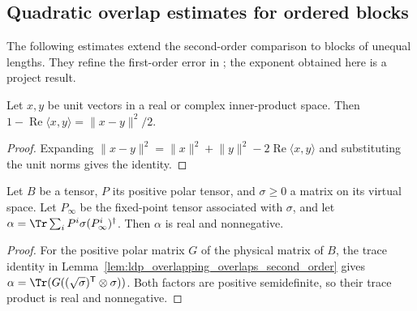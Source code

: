 \subsection{Quadratic overlap estimates for ordered blocks}

The following estimates extend the second-order comparison to blocks of
unequal lengths. They refine the first-order error in
\cite[Lemma~1$'$(i), eq.~(S11)]{Malz2024Preparation}; the exponent obtained
here is a project result.

\begin{lemma}
    \label{thm:ldp_unit_vector_deficit}
    \leanok
    Let $x,y$ be unit vectors in a real or complex inner-product space. Then
    $1-\operatorname{Re}\langle x,y\rangle=\lVert x-y\rVert^2/2$.
\end{lemma}
\begin{proof}\leanok
    Expanding $\lVert x-y\rVert^2=\lVert x\rVert^2+\lVert y\rVert^2
        -2\operatorname{Re}\langle x,y\rangle$ and substituting the unit norms
    gives the identity.
\end{proof}

\begin{lemma}
    \label{thm:ldp_polar_compression_nonnegative}
    \leanok
    Let $B$ be a tensor, $P$ its positive polar tensor, and $\sigma\ge0$ a
    matrix on its virtual space. Let $P_\infty$ be the fixed-point tensor
    associated with $\sigma$, and let
    $\alpha=\Tr\sum_iP^i\sigma(P_\infty^i)^\dagger$.
    Then $\alpha$ is real and nonnegative.
\end{lemma}
\begin{proof}\leanok
    For the positive polar matrix $G$ of the physical matrix of $B$,
    the trace identity in Lemma~\ref{lem:ldp_overlapping_overlaps_second_order}
    gives $\alpha=\Tr(G((\sqrt\sigma)^{\mathsf T}\otimes\sigma))$.
    Both factors are positive semidefinite, so their trace product is
    real and nonnegative.
\end{proof}

